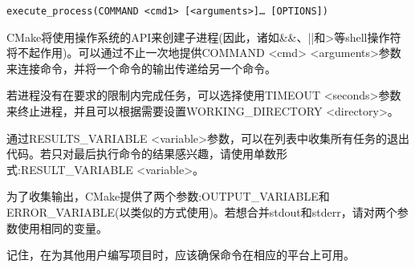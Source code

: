 \begin{lstlisting}[style=styleCMake]
execute_process(COMMAND <cmd1> [<arguments>]… [OPTIONS])
\end{lstlisting}

CMake将使用操作系统的API来创建子进程(因此，诸如\&\&、||和>等shell操作符将不起作用)。可以通过不止一次地提供COMMAND <cmd> <arguments>参数来连接命令，并将一个命令的输出传递给另一个命令。

若进程没有在要求的限制内完成任务，可以选择使用TIMEOUT <seconds>参数来终止进程，并且可以根据需要设置WORKING\_DIRECTORY <directory>。

通过RESULTS\_VARIABLE <variable>参数，可以在列表中收集所有任务的退出代码。若只对最后执行命令的结果感兴趣，请使用单数形式:RESULT\_VARIABLE <variable>。

为了收集输出，CMake提供了两个参数:OUTPUT\_VARIABLE和ERROR\_VARIABLE(以类似的方式使用)。若想合并stdout和stderr，请对两个参数使用相同的变量。

记住，在为其他用户编写项目时，应该确保命令在相应的平台上可用。
















